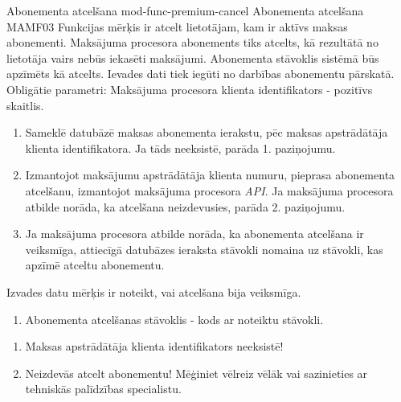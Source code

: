 \moduleFunctionTable
{Abonementa atcelšana}
{mod-func-premium-cancel}
{Abonementa atcelšana}
{MAMF03}
{
	Funkcijas mērķis ir atcelt lietotājam, kam ir aktīvs maksas abonementi.
	Maksājuma procesora abonements tiks atcelts, kā rezultātā no lietotāja vairs nebūs iekasēti maksājumi.
	Abonementa stāvoklis sistēmā būs apzīmēts kā atcelts.
}
{
	Ievades dati tiek iegūti no darbības abonementu pārskatā.
	Obligātie parametri:
	Maksājuma procesora klienta identifikators - pozitīvs skaitlis.
}
{
	\begin{enumerate}
		\item Sameklē datubāzē maksas abonementa ierakstu, pēc maksas apstrādātāja klienta identifikatora.
		      Ja tāds neeksistē, parāda 1. paziņojumu.
		\item Izmantojot maksājumu apstrādātāja klienta numuru, pieprasa abonementa atcelšanu, izmantojot maksājuma procesora \emph{API}.
		      Ja maksājuma procesora atbilde norāda, ka atcelšana neizdevusies, parāda 2. paziņojumu.
		\item Ja maksājuma procesora atbilde norāda, ka abonementa atcelšana ir veiksmīga, attiecīgā datubāzes ieraksta stāvokli nomaina uz stāvokli, kas apzīmē atceltu abonementu.
	\end{enumerate}
}
{
	Izvades datu mērķis ir noteikt, vai atcelšana bija veiksmīga.
	\begin{enumerate}
		\item Abonementa atcelšanas stāvoklis - kods ar noteiktu stāvokli.
	\end{enumerate}
}
{
	\begin{enumerate}
		\item Maksas apstrādātāja klienta identifikators neeksistē!
		\item Neizdevās atcelt abonementu! Mēģiniet vēlreiz vēlāk vai sazinieties ar tehniskās palīdzības specialistu.
	\end{enumerate}
}
